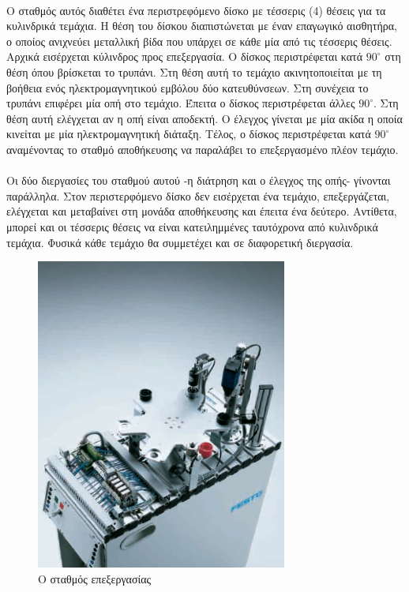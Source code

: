\documentclass[a4paper,12pt,twoside]{report}
\begin{document}
				\paragraph{} {Ο σταθμός αυτός διαθέτει ένα περιστρεφόμενο δίσκο με τέσσερις (4) θέσεις για τα κυλινδρικά τεμάχια. Η θέση του δίσκου διαπιστώνεται με έναν επαγωγικό αισθητήρα, ο οποίος ανιχνεύει μεταλλική βίδα που υπάρχει σε κάθε μία από τις τέσσερις θέσεις. Αρχικά εισέρχεται κύλινδρος προς επεξεργασία. Ο δίσκος περιστρέφεται κατά $90^{\circ}$ στη θέση όπου βρίσκεται το τρυπάνι. Στη θέση αυτή το τεμάχιο ακινητοποιείται με τη βοήθεια ενός ηλεκτρομαγνητικού εμβόλου δύο κατευθύνσεων. Στη συνέχεια το τρυπάνι επιφέρει μία οπή στο τεμάχιο. Έπειτα ο δίσκος περιστρέφεται άλλες $90^{\circ}$. Στη θέση αυτή ελέγχεται αν η οπή είναι αποδεκτή. Ο έλεγχος γίνεται με μία ακίδα η οποία κινείται με μία ηλεκτρομαγνητική διάταξη. Τέλος, ο δίσκος περιστρέφεται κατά $90^{\circ}$ αναμένοντας το σταθμό αποθήκευσης να παραλάβει το επεξεργασμένο πλέον τεμάχιο.
				}
				\paragraph{} {Οι δύο διεργασίες του σταθμού αυτού -η διάτρηση και ο έλεγχος της οπής- γίνονται παράλληλα. Στον περιστερφόμενο δίσκο δεν εισέρχεται ένα τεμάχιο, επεξεργάζεται, ελέγχεται και μεταβαίνει στη μονάδα αποθήκευσης και έπειτα ένα δεύτερο. Αντίθετα, μπορεί και οι τέσσερις θέσεις να είναι κατειλημμένες ταυτόχρονα από κυλινδρικά τεμάχια. Φυσικά κάθε τεμάχιο θα συμμετέχει και σε διαφορετική διεργασία.
				}
				\begin{figure}[hp]
					\centering
					\includegraphics[scale=0.25]{ProcessingStationFesto.png}
					\caption{Ο σταθμός επεξεργασίας \cite{OverviewMPSStations}}
					\label{φωτ:Ο σταθμός επεξεργασίας από Festo}
				\end{figure}
								
\end{document}
